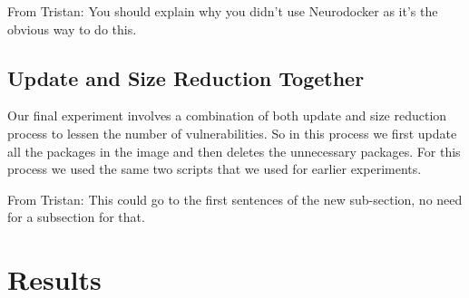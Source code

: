\documentclass[a4paper,num-refs]{oup-contemporary}
\newcommand{\tristan}[1]{\color{blue}From Tristan: #1\color{black}}
\begin{document}
\tristan{You should explain why you didn't use Neurodocker as it's the obvious way to do this.}

\subsection{Update and Size Reduction Together}

Our final experiment involves a combination of both update and size reduction process
to lessen the number of vulnerabilities.
So in this process we first update all the packages in the image and then deletes
the unnecessary packages. For this process we used the same two scripts that
we used for earlier experiments.

\tristan{This could go to the first sentences of the new sub-section, no need for a subsection for that.}

\section{Results}
\end{document}
